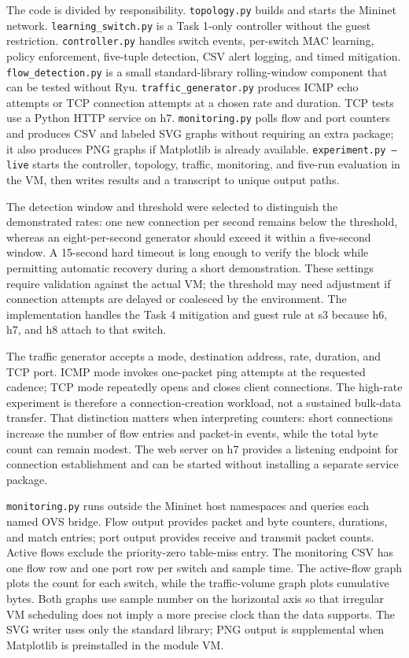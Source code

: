 \documentclass[conference]{IEEEtran}
\begin{document}
The code is divided by responsibility. \texttt{topology.py} builds and starts the Mininet network. \texttt{learning\_switch.py} is a Task 1-only controller without the guest restriction. \texttt{controller.py} handles switch events, per-switch MAC learning, policy enforcement, five-tuple detection, CSV alert logging, and timed mitigation. \texttt{flow\_detection.py} is a small standard-library rolling-window component that can be tested without Ryu. \texttt{traffic\_generator.py} produces ICMP echo attempts or TCP connection attempts at a chosen rate and duration. TCP tests use a Python HTTP service on h7. \texttt{monitoring.py} polls flow and port counters and produces CSV and labeled SVG graphs without requiring an extra package; it also produces PNG graphs if Matplotlib is already available. \texttt{experiment.py --live} starts the controller, topology, traffic, monitoring, and five-run evaluation in the VM, then writes results and a transcript to unique output paths.

The detection window and threshold were selected to distinguish the demonstrated rates: one new connection per second remains below the threshold, whereas an eight-per-second generator should exceed it within a five-second window. A 15-second hard timeout is long enough to verify the block while permitting automatic recovery during a short demonstration. These settings require validation against the actual VM; the threshold may need adjustment if connection attempts are delayed or coalesced by the environment. The implementation handles the Task 4 mitigation and guest rule at s3 because h6, h7, and h8 attach to that switch.

The traffic generator accepts a mode, destination address, rate, duration, and TCP port. ICMP mode invokes one-packet ping attempts at the requested cadence; TCP mode repeatedly opens and closes client connections. The high-rate experiment is therefore a connection-creation workload, not a sustained bulk-data transfer. That distinction matters when interpreting counters: short connections increase the number of flow entries and packet-in events, while the total byte count can remain modest. The web server on h7 provides a listening endpoint for connection establishment and can be started without installing a separate service package.

\texttt{monitoring.py} runs outside the Mininet host namespaces and queries each named OVS bridge. Flow output provides packet and byte counters, durations, and match entries; port output provides receive and transmit packet counts. Active flows exclude the priority-zero table-miss entry. The monitoring CSV has one flow row and one port row per switch and sample time. The active-flow graph plots the count for each switch, while the traffic-volume graph plots cumulative bytes. Both graphs use sample number on the horizontal axis so that irregular VM scheduling does not imply a more precise clock than the data supports. The SVG writer uses only the standard library; PNG output is supplemental when Matplotlib is preinstalled in the module VM.
\end{document}
